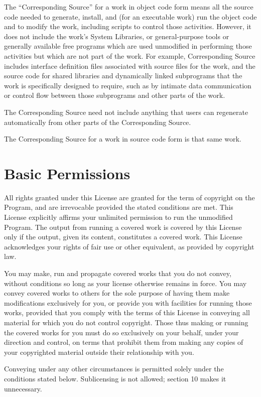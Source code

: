 The “Corresponding Source” for a work in object code form means all the source code needed to generate, install, and (for an executable work) run the object code and to modify the work, including scripts to control those activities. However, it does not include the work's System Libraries, or general-purpose tools or generally available free programs which are used unmodified in performing those activities but which are not part of the work. For example, Corresponding Source includes interface definition files associated with source files for the work, and the source code for shared libraries and dynamically linked subprograms that the work is specifically designed to require, such as by intimate data communication or control flow between those subprograms and other parts of the work.

The Corresponding Source need not include anything that users can regenerate automatically from other parts of the Corresponding Source.

The Corresponding Source for a work in source code form is that same work.
\section{Basic Permissions}

All rights granted under this License are granted for the term of copyright on the Program, and are irrevocable provided the stated conditions are met. This License explicitly affirms your unlimited permission to run the unmodified Program. The output from running a covered work is covered by this License only if the output, given its content, constitutes a covered work. This License acknowledges your rights of fair use or other equivalent, as provided by copyright law.

You may make, run and propagate covered works that you do not convey, without conditions so long as your license otherwise remains in force. You may convey covered works to others for the sole purpose of having them make modifications exclusively for you, or provide you with facilities for running those works, provided that you comply with the terms of this License in conveying all material for which you do not control copyright. Those thus making or running the covered works for you must do so exclusively on your behalf, under your direction and control, on terms that prohibit them from making any copies of your copyrighted material outside their relationship with you.

Conveying under any other circumstances is permitted solely under the conditions stated below. Sublicensing is not allowed; section 10 makes it unnecessary.
